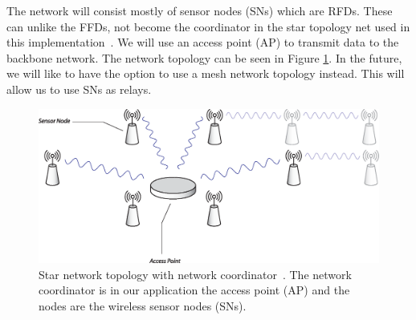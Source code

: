 The network will consist mostly of sensor nodes (SNs) which are RFDs. These can unlike the FFDs, not become the coordinator in the star topology net used in this implementation~\cite{zigbee, 802.15.4}. We will use an access point (AP) to transmit data to the backbone network. The network topology can be seen in Figure \ref{fig:network}. In the future, we will like to have the option to use a mesh network topology instead. This will allow us to use SNs as relays.

\begin{figure}[hbtf]
 \centering
 \begin{minipage}{1\linewidth}
  \includegraphics[width=1\linewidth]{images/network.eps}
 \caption[Mesh network topology]{Star network topology with network coordinator~\cite{802.15.4, zigbee}. The network coordinator is in our application the access point (AP) and the nodes are the wireless sensor nodes (SNs).}
 \label{fig:network}
 \end{minipage}
\end{figure}
 	
